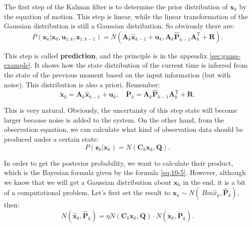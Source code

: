 The first step of the Kalman filter is to determine the prior distribution of $\bm{x}_k$ by the equation of motion. This step is linear, while the linear transformation of the Gaussian distribution is still a Gaussian distribution. So obviously there are:
\begin{equation}
P\left( {{\bm{x}_k}|{\bm{x}_0},{\bm{u}_{1:k}},{\bm{z}_{1:k - 1}}} \right) = N\left( {\bm{A}_k {{\hat{\bm{x}}}_{k - 1}} + {\bm{u}_k}, \bm{A}_k\hat{\bm{P}}_{k-1} {\bm{A}_k^\mathrm{T}} + \bm{R}} \right).
\end{equation}

This step is called \textbf{prediction}, and the principle is in the appendix \ref{sec:gauss-example}. It shows how the state distribution of the current time is inferred from the state of the previous moment based on the input information (but with noise). This distribution is also a priori. Remember:
\begin{equation}
\check{\bm{x}}_k = {\bm{A}_k {{\hat{\bm{x}}}_{k - 1}} + {\bm{u}_k}}, \quad \check{\bm{P}}_k = {\bm{A}_k \hat{\bm{P}}_{k-1} { \bm{A}^\mathrm{T}_k} + \bm{R}}.
\end{equation}

This is very natural. Obviously, the uncertainty of this step state will become larger because noise is added to the system. On the other hand, from the observation equation, we can calculate what kind of observation data should be produced under a certain state:
\begin{equation}
P\left( {{\bm{z}_k}|{\bm{x}_k}} \right) = N\left( {{\bm{C}_k}{\bm{x}_k},\bm{Q}} \right) .
\end{equation}

In order to get the posterior probability, we want to calculate their product, which is the Bayesian formula given by the formula \eqref{eq:10-5}. However, although we know that we will get a Gaussian distribution about $\bm{x}_k$ in the end, it is a bit of a computational problem. Let's first set the result to $\bm{x}_k \sim N(\ Bm{\hat{x}}_k, \bm{\hat{P}}_k )$, then:
\begin{equation}
N(\bm{\hat{x}}_k, \bm{\hat{P}}_k ) = \eta N\left( {{\bm{C}_k}{\bm{x}_k},\bm{Q}} \right) \cdot N( \bm{\check{x}}_k, \bm{\check{P}}_k). 
\end{equation}

